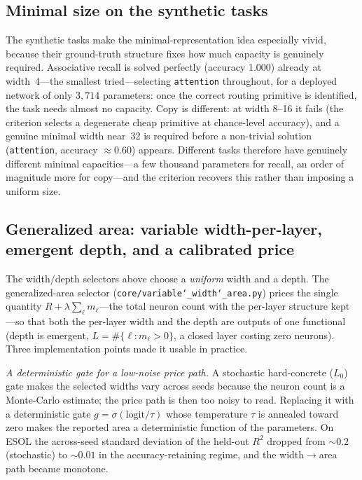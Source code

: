 \documentclass[11pt]{article}
\newcommand{\allowbreakhere}{\discretionary{}{}{}}
\newcommand{\code}[1]{\texttt{\def\_{\char`_\allowbreakhere}#1}}
\begin{document}
\subsection{Minimal size on the synthetic tasks}
\label{sec:synthsize}

The synthetic tasks make the minimal-representation idea especially vivid, because their
ground-truth structure fixes how much capacity is genuinely required. Associative recall is
solved perfectly (accuracy 1.000) already at width~4---the smallest tried---selecting
\code{attention} throughout, for a deployed network of only $3{,}714$ parameters: once the
correct routing primitive is identified, the task needs almost no capacity. Copy is different:
at width 8--16 it fails (the criterion selects a degenerate cheap primitive at chance-level
accuracy), and a genuine minimal width near~32 is required before a non-trivial solution
(\code{attention}, accuracy $\approx0.60$) appears. Different tasks therefore have genuinely
different minimal capacities---a few thousand parameters for recall, an order of magnitude more
for copy---and the criterion recovers this rather than imposing a uniform size.

\subsection{Generalized area: variable width-per-layer, emergent depth, and a calibrated price}
\label{sec:genarea}

The width/depth selectors above choose a \emph{uniform} width and a depth. The generalized-area selector
(\code{core/variable\_width\_area.py}) prices the single quantity $R+\lambda\sum_\ell m_\ell$---the total
neuron count with the per-layer structure kept---so that both the per-layer width and the depth are outputs of
one functional (depth is emergent, $L=\#\{\ell:m_\ell>0\}$, a closed layer costing zero neurons). Three
implementation points made it usable in practice.

\emph{A deterministic gate for a low-noise price path.} A stochastic hard-concrete ($L_0$) gate makes the
selected widths vary across seeds because the neuron count is a Monte-Carlo estimate; the price path is then
too noisy to read. Replacing it with a deterministic gate $g=\sigma(\text{logit}/\tau)$ whose temperature
$\tau$ is annealed toward zero makes the reported area a deterministic function of the parameters. On ESOL the
across-seed standard deviation of the held-out $R^2$ dropped from $\sim\!0.2$ (stochastic) to $\sim\!0.01$ in
the accuracy-retaining regime, and the width$\to$\allowbreak area path became monotone.
\end{document}
